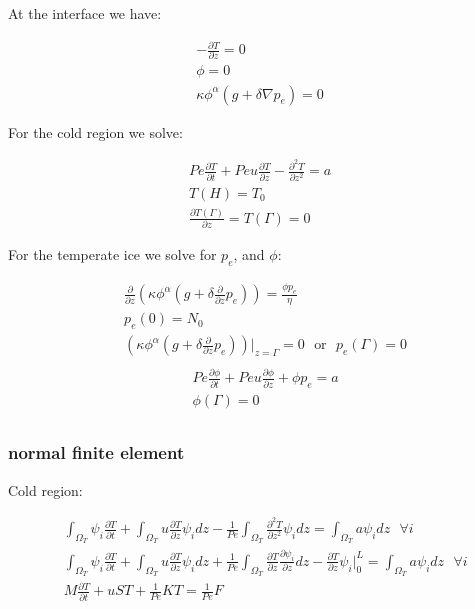 \documentclass[a4paper,12pt]{article}
\newcommand{\pd}[2]{\frac{\partial #1}{\partial #2}}
\newcommand{\pdt}[2]{\frac{\partial^2 #1}{\partial #2 ^2}}
\begin{document}
At the interface we have:

\begin{align*}
  -\pd{T}{z} = 0\\
  \phi = 0\\
  \kappa \phi^\alpha( g + \delta \nabla p_e) = 0
\end{align*}

For the cold region we solve:

\begin{align}
  Pe\pd{T}{t} + Pe u \pd{T}{z} - \pdt{T}{z} = a \\
  T(H) = T_0\\
  \pd{T(\Gamma)}{z} = T(\Gamma) = 0
\end{align}

For the temperate ice we solve for $p_e$, and $\phi$:

\begin{align}
  &\pd{}{z}\left(\kappa\phi^\alpha\left(g + \delta\pd{}{z}p_e\right)\right) = \frac{\phi p_e}{\eta} \label{eq:pe-equation}\\
  &p_e(0) = N_0\\
  &\left(\kappa \phi^\alpha\left( g + \delta \pd{}{z} p_e\right)\right)\bigg\rvert_{z=\Gamma} = 0 ~~~ \text{or} ~~~ p_e(\Gamma) = 0\\
\end{align}
\begin{align}
  &Pe\pd{\phi}{t} + Pe u \pd{\phi}{z} + \phi p_e = a \label{eq:phi-equation}\\
  &\phi(\Gamma) = 0\\
\end{align}

\subsubsection{normal finite element}

Cold region:

\begin{align*}
  &\int_{\Omega_T} \psi_i\pd{T}{t} + \int_{\Omega_T} u \pd{T}{z}\psi_i dz - \frac{1}{Pe}\int_{\Omega_T} \pdt{T}{z}\psi_i dz = \int_{\Omega_T} a\psi_i dz ~~~ \forall i \\
  &\int_{\Omega_T} \psi_i\pd{T}{t} + \int_{\Omega_T} u \pd{T}{z}\psi_i dz + \frac{1}{Pe}\int_{\Omega_T} \pd{T}{z}\pd{\psi_i}{z} dz - \pd{T}{z} \psi_i \bigg\rvert_0^L = \int_{\Omega_T} a\psi_i dz ~~~ \forall i \\
  & M\pd{T}{t} + uST + \frac{1}{Pe}KT = \frac{1}{Pe}F
\end{align*}
\end{document}
